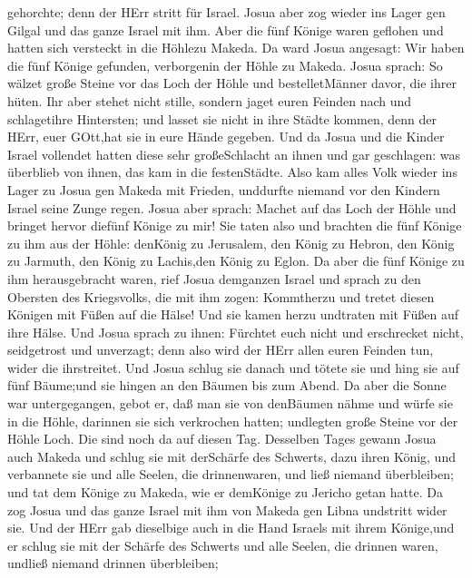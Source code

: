 gehorchte; denn der HErr stritt für Israel.  Josua aber zog
wieder ins Lager gen Gilgal und das ganze Israel mit ihm. 
Aber die fünf Könige waren geflohen und hatten sich versteckt in die
Höhlezu Makeda.  Da ward Josua angesagt: Wir haben die fünf
Könige gefunden, verborgenin der Höhle zu Makeda.  Josua
sprach: So wälzet große Steine vor das Loch der Höhle und
bestelletMänner davor, die ihrer hüten.  Ihr aber stehet
nicht stille, sondern jaget euren Feinden nach und schlagetihre
Hintersten; und lasset sie nicht in ihre Städte kommen, denn der HErr,
euer GOtt,hat sie in eure Hände gegeben.  Und da Josua und
die Kinder Israel vollendet hatten diese sehr großeSchlacht an ihnen und
gar geschlagen: was überblieb von ihnen, das kam in die festenStädte.
 Also kam alles Volk wieder ins Lager zu Josua gen Makeda
mit Frieden, unddurfte niemand vor den Kindern Israel seine Zunge regen.
 Josua aber sprach: Machet auf das Loch der Höhle und
bringet hervor diefünf Könige zu mir!  Sie taten also und
brachten die fünf Könige zu ihm aus der Höhle: denKönig zu Jerusalem,
den König zu Hebron, den König zu Jarmuth, den König zu Lachis,den König
zu Eglon.  Da aber die fünf Könige zu ihm herausgebracht
waren, rief Josua demganzen Israel und sprach zu den Obersten des
Kriegsvolks, die mit ihm zogen: Kommtherzu und tretet diesen Königen mit
Füßen auf die Hälse! Und sie kamen herzu undtraten mit Füßen auf ihre
Hälse.  Und Josua sprach zu ihnen: Fürchtet euch nicht und
erschrecket nicht, seidgetrost und unverzagt; denn also wird der HErr
allen euren Feinden tun, wider die ihrstreitet.  Und Josua
schlug sie danach und tötete sie und hing sie auf fünf Bäume;und sie
hingen an den Bäumen bis zum Abend.  Da aber die Sonne war
untergegangen, gebot er, daß man sie von denBäumen nähme und würfe sie
in die Höhle, darinnen sie sich verkrochen hatten; undlegten große
Steine vor der Höhle Loch. Die sind noch da auf diesen Tag.
 Desselben Tages gewann Josua auch Makeda und schlug sie
mit derSchärfe des Schwerts, dazu ihren König, und verbannete sie und
alle Seelen, die drinnenwaren, und ließ niemand überbleiben; und tat dem
Könige zu Makeda, wie er demKönige zu Jericho getan hatte. 
Da zog Josua und das ganze Israel mit ihm von Makeda gen Libna undstritt
wider sie.  Und der HErr gab dieselbige auch in die Hand
Israels mit ihrem Könige,und er schlug sie mit der Schärfe des Schwerts
und alle Seelen, die drinnen waren, undließ niemand drinnen überbleiben;
